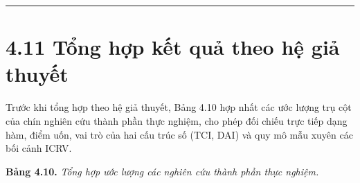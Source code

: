 \documentclass[
  a4paper,
  13pt]{extreport}
\begin{document}
\begin{center}\rule{0.5\linewidth}{0.5pt}\end{center}

\hypertarget{tux1ed5ng-hux1ee3p-kux1ebft-quux1ea3-theo-hux1ec7-giux1ea3-thuyux1ebft}{%
\section{4.11 Tổng hợp kết quả theo hệ giả
thuyết}\label{tux1ed5ng-hux1ee3p-kux1ebft-quux1ea3-theo-hux1ec7-giux1ea3-thuyux1ebft}}

Trước khi tổng hợp theo hệ giả thuyết, Bảng 4.10 hợp nhất các ước lượng
trụ cột của chín nghiên cứu thành phần thực nghiệm, cho phép đối chiếu
trực tiếp dạng hàm, điểm uốn, vai trò của hai cấu trúc số (TCI, DAI) và
quy mô mẫu xuyên các bối cảnh ICRV.

\textbf{Bảng 4.10.} \emph{Tổng hợp ước lượng các nghiên cứu thành phần
thực nghiệm.}
\end{document}
